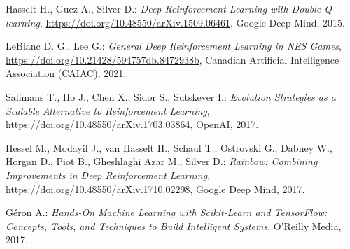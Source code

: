 \documentclass{pginz}
\begin{document}

%

\setcounter{page}{2}

%
%

\tableofcontents
{}

%
%

%



\begin{thebibliography}{99}

Hasselt H., Guez A., Silver D.:
\emph{Deep Reinforcement Learning with Double Q-learning}, 
\url{https://doi.org/10.48550/arXiv.1509.06461},
Google Deep Mind, 2015.

LeBlanc D. G., Lee G.:
\emph{General Deep Reinforcement Learning in NES Games}, 
\url{https://doi.org/10.21428/594757db.8472938b},
Canadian Artificial Intelligence Association (CAIAC), 2021. 

Salimans T., Ho J., Chen X., Sidor S., Sutskever I.:
\emph{Evolution Strategies as a Scalable Alternative to Reinforcement Learning}, 
\url{https://doi.org/10.48550/arXiv.1703.03864}, OpenAI, 2017.

Hessel M., Modayil J., van Hasselt H., Schaul T., Ostrovski G., Dabney W., Horgan D., Piot B., Gheshlaghi Azar M., Silver D.:
\emph{Rainbow: Combining Improvements in Deep Reinforcement Learning}, 
\url{https://doi.org/10.48550/arXiv.1710.02298},
Google Deep Mind, 2017.

Géron A.:
\emph{Hands-On Machine Learning with Scikit-Learn and TensorFlow: Concepts, Tools, and Techniques to Build Intelligent Systems}, 
O'Reilly Media, 2017.

\end{thebibliography}
\begin{appendices}
%
%
\end{appendices}
\end{document}
